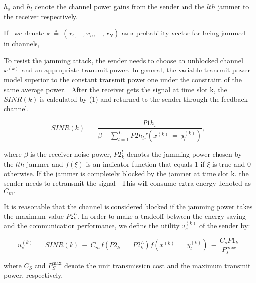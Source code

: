 \documentclass[letterpaper%
, twoside%
, 12pt%
,thesepararticles%
, english%
,creativecommons,hyperref, withAlgo2e%
]{thETS}
\begin{document}
 $\displaystyle h_{s}$ and $\displaystyle h_{l}$ denote the channel power gains from the sender and the $\displaystyle lth$ jammer to the receiver respectively. 

If \ we denote $\displaystyle \mathbb{x} \ \triangleq \ ( x_{0,} \dotsc ,x_{n} ,\dotsc ,x_{N})$ as a probability vector for being jammed in channels,


To resist the jamming attack, the sender needs to choose an unblocked channel $\displaystyle x^{( k)}$ and an appropriate transmit power. In general, the variable transmit power model  superior to the constant transmit power one under the constraint of the same average power. \ After the receiver gets the signal at time slot k, the $\displaystyle SINR( k)$ is calculated by (1) and returned to the sender through the feedback channel. 
 
\begin{equation}
SINR( k) \ =\ \frac{P1h_{s}}{\beta +\sum _{l=1}^{L} P2h_{l} f\left( x^{( k)} \ =\ y_{l}^{( k)}\right)} ,
\end{equation}
 
 where $\displaystyle \beta $ is the receiver noise power, $\displaystyle P2_{k}^{l}$ denotes the jamming power chosen by the $\displaystyle lth$ jammer and $\displaystyle f( \xi )$ is an indicator function that equals 1 if $\displaystyle \xi $ is true and 0 otherwise. If the jammer is completely blocked by the jammer at time slot k, the sender needs to retransmit the signal \ This will consume extra energy denoted as $\displaystyle C_{m} .$

It is reasonable that the channel is considered blocked if the jamming power takes the maximum value $\displaystyle P2_{k}^{L} .$ In order to make a tradeoff between the energy saving and the communication performance, we define the utility $\displaystyle u_{s}^{( k)}$ of the sender by: 
 
\begin{equation}
u_{s}^{( k)} \ =\ SINR( k) \ -\ C_{m} f\left( P2_{k} \ =\ P2_{k}^{L}\right) f\left( x^{( k)} \ =\ y_{l}^{( k)}\right) \ -\ \frac{C_{s} P1_{k}}{P_{s}^{max}}
\end{equation}

where $\displaystyle C_{S}$ and $\displaystyle P_{S}^{\max}$ denote the unit transmission cost and the maximum transmit power, respectively. 
\end{document}
